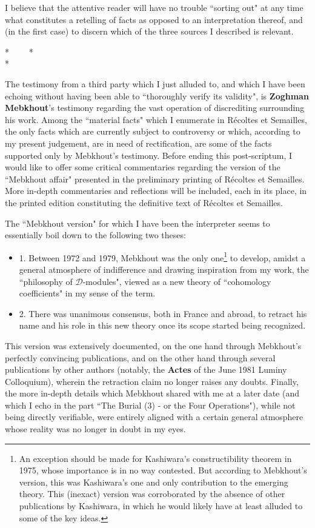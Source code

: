 I believe that the attentive reader will have no trouble ``sorting out" at any time what constitutes a retelling of facts as opposed to an interpretation thereof, and (in the first case) to discern which of the three sources I described is relevant.

\begin{center} * \ \ \ \ * \\ *  \end{center}

The testimony from a third party which I just alluded to, and which I have been echoing without having been able to ``thoroughly verify its validity", is \textbf{Zoghman Mebkhout}'s testimony regarding the vast operation of discrediting surrounding his work. Among the ``material facts" which I enumerate in R\'ecoltes et Semailles, the only facts which are currently subject to controversy or which, according to my present judgement, are in need of rectification, are some of the facts supported only by Mebkhout's testimony. Before ending this post-scriptum, I would like to offer some critical commentaries regarding the version of the ``Mebkhout affair" presented in the preliminary printing of R\'ecoltes et Semailles. More in-depth commentaries and reflections will be included, each in its place, in the printed edition constituting the definitive text of R\'ecoltes et Semailles. 

The ``Mebkhout version" for which I have been the interpreter seems to essentially boil down to the following two theses:
\begin{itemize}

\item 1. Between 1972 and 1979, Mebkhout was the only one\footnote{An exception should be made for Kashiwara's constructibility theorem in 1975, whose importance is in no way contested. But according to Mebkhout's version, this was Kashiwara's one and only contribution to the emerging theory. This (inexact) version was corroborated by the absence of other publications by Kashiwara, in which he would likely have at least alluded to some of the key ideas.} to develop, amidst a general atmosphere of indifference and drawing inspiration from my work, the ``philosophy of $\mathcal{D}$-modules", viewed as a new theory of ``cohomology coefficients" in my sense of the term.

\item 2. There was unanimous consensus, both in France and abroad, to retract his name and his role in this new theory once its scope started being recognized.

\end{itemize}
This version was extensively documented, on the one hand through Mebkhout's perfectly convincing publications, and on the other hand through several publications by other authors (notably, the \textbf{Actes} of the June 1981 Luminy Colloquium), wherein the retraction claim no longer raises any doubts. Finally, the more in-depth details which Mebkhout shared with me at a later date (and which I echo in the part ``The Burial (3) - or the Four Operations"), while not being directly verifiable, were entirely aligned with a certain general atmosphere whose reality was no longer in doubt in my eyes.

